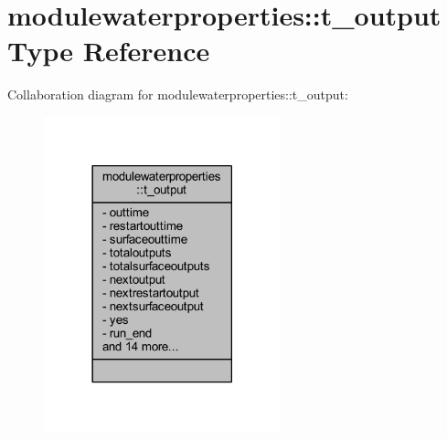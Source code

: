 \hypertarget{structmodulewaterproperties_1_1t__output}{}\section{modulewaterproperties\+:\+:t\+\_\+output Type Reference}
\label{structmodulewaterproperties_1_1t__output}


Collaboration diagram for modulewaterproperties\+:\+:t\+\_\+output\+:\nopagebreak
\begin{figure}[H]
\begin{center}
\leavevmode
\includegraphics[width=194pt]{structmodulewaterproperties_1_1t__output__coll__graph}
\end{center}
\end{figure}
